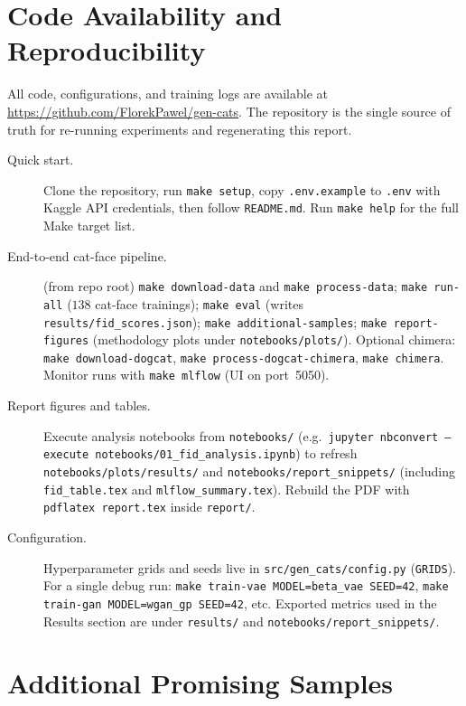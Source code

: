 \documentclass[cameraready]{Interspeech}
\begin{document}
\section{Code Availability and Reproducibility}

All code, configurations, and training logs are available at \url{https://github.com/FlorekPawel/gen-cats}. The repository is the single source of truth for re-running experiments and regenerating this report.

\begin{description}
  \item[Quick start.] Clone the repository, run \texttt{make setup}, copy \texttt{.env.example} to \texttt{.env} with Kaggle API credentials, then follow \texttt{README.md}. Run \texttt{make help} for the full Make target list.

  \item[End-to-end cat-face pipeline.] (from repo root) \texttt{make download-data} and \texttt{make process-data}; \texttt{make run-all} ($138$ cat-face trainings); \texttt{make eval} (writes \texttt{results/fid\_scores.json}); \texttt{make additional-samples}; \texttt{make report-figures} (methodology plots under \texttt{notebooks/plots/}). Optional chimera: \texttt{make download-dogcat}, \texttt{make process-dogcat-chimera}, \texttt{make chimera}. Monitor runs with \texttt{make mlflow} (UI on port~5050).

  \item[Report figures and tables.] Execute analysis notebooks from \texttt{notebooks/} (e.g.\ \texttt{jupyter nbconvert --execute notebooks/01\_fid\_analysis.ipynb}) to refresh \texttt{notebooks/plots/results/} and \texttt{notebooks/report\_snippets/} (including \texttt{fid\_table.tex} and \texttt{mlflow\_summary.tex}). Rebuild the PDF with \texttt{pdflatex report.tex} inside \texttt{report/}.

  \item[Configuration.] Hyperparameter grids and seeds live in \texttt{src/gen\_cats/config.py} (\texttt{GRIDS}). For a single debug run: \texttt{make train-vae MODEL=beta\_vae SEED=42}, \texttt{make train-gan MODEL=wgan\_gp SEED=42}, etc. Exported metrics used in the Results section are under \texttt{results/} and \texttt{notebooks/report\_snippets/}.
\end{description}

\section{Additional Promising Samples}
\label{app:promising_samples}
\end{document}
